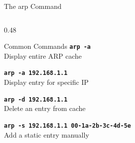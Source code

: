 \documentclass[aspectratio=169]{beamer}  %
\begin{document}
\begin{frame}{The arp Command}
    \begin{columns}[T]
        \begin{column}{0.48\textwidth}
            \begin{block}{Common Commands}
                \small
                \texttt{\textbf{arp -a}} \\
                Display entire ARP cache
                
                \vspace{0.3em}
                \texttt{\textbf{arp -a 192.168.1.1}} \\
                Display entry for specific IP
                
                \vspace{0.3em}
                \texttt{\textbf{arp -d 192.168.1.1}} \\
                Delete an entry from cache
                
                \vspace{0.3em}
                \texttt{\textbf{arp -s 192.168.1.1 00-1a-2b-3c-4d-5e}} \\
                Add a static entry manually
            \end{block}
            

\end{column}
\end{columns}
\end{frame}
\end{document}
